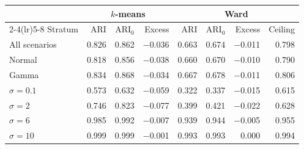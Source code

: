 \begin{tabular}{lrrrrrrr}
\toprule
 & \multicolumn{3}{c}{$k$-means} & \multicolumn{4}{c}{Ward} \\
\cmidrule(lr){2-4}\cmidrule(lr){5-8}
Stratum & ARI & ARI$_0$ & Excess & ARI & ARI$_0$ & Excess & Ceiling \\
\midrule
All scenarios & 0.826 & 0.862 & $-$0.036 & 0.663 & 0.674 & $-$0.011 & 0.798 \\
\addlinespace
Normal & 0.818 & 0.856 & $-$0.038 & 0.660 & 0.670 & $-$0.010 & 0.790 \\
Gamma & 0.834 & 0.868 & $-$0.034 & 0.667 & 0.678 & $-$0.011 & 0.806 \\
\addlinespace
$\sigma = 0.1$ & 0.573 & 0.632 & $-$0.059 & 0.322 & 0.337 & $-$0.015 & 0.615 \\
$\sigma = 2$ & 0.746 & 0.823 & $-$0.077 & 0.399 & 0.421 & $-$0.022 & 0.628 \\
$\sigma = 6$ & 0.985 & 0.992 & $-$0.007 & 0.939 & 0.944 & $-$0.005 & 0.955 \\
$\sigma = 10$ & 0.999 & 0.999 & $-$0.001 & 0.993 & 0.993 & 0.000 & 0.994 \\
\bottomrule
\end{tabular}

